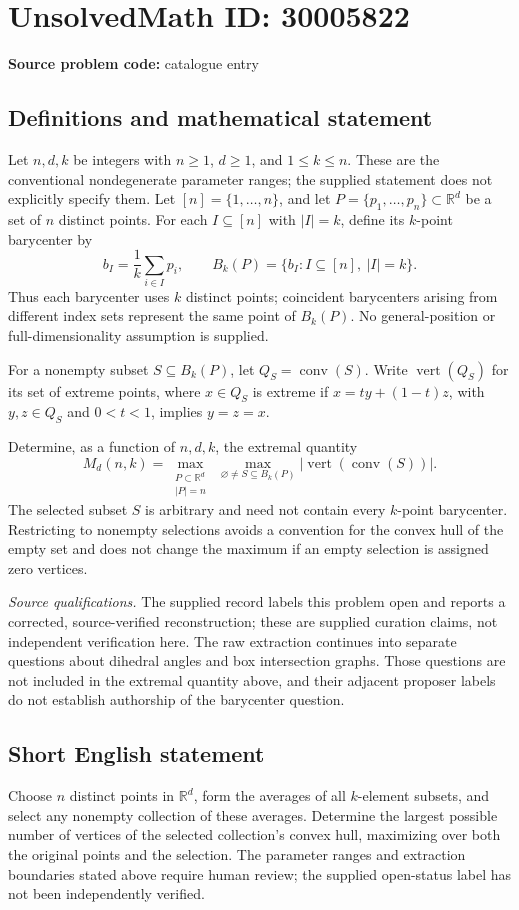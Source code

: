 \documentclass[11pt]{article}
\newcommand{\R}{\mathbb{R}}
\begin{document}
\section*{UnsolvedMath ID: 30005822}
\textbf{Source problem code:} catalogue entry
\subsection{Definitions and mathematical statement}
Let \(n,d,k\) be integers with \(n\geq 1\), \(d\geq 1\), and \(1\leq k\leq n\). These are the conventional nondegenerate parameter ranges; the supplied statement does not explicitly specify them. Let \([n]=\{1,\ldots,n\}\), and let \(P=\{p_1,\ldots,p_n\}\subset\R^d\) be a set of \(n\) distinct points. For each \(I\subseteq[n]\) with \(|I|=k\), define its \(k\)-point barycenter by
\[
 b_I=\frac{1}{k}\sum_{i\in I}p_i,
 \qquad
 B_k(P)=\{b_I:I\subseteq[n],\ |I|=k\}.
\]
Thus each barycenter uses \(k\) distinct points; coincident barycenters arising from different index sets represent the same point of \(B_k(P)\). No general-position or full-dimensionality assumption is supplied.

For a nonempty subset \(S\subseteq B_k(P)\), let \(Q_S=\operatorname{conv}(S)\). Write \(\operatorname{vert}(Q_S)\) for its set of extreme points, where \(x\in Q_S\) is extreme if \(x=ty+(1-t)z\), with \(y,z\in Q_S\) and \(0<t<1\), implies \(y=z=x\).

Determine, as a function of \(n,d,k\), the extremal quantity
\[
 M_d(n,k)=
 \max_{\substack{P\subset\R^d\\ |P|=n}}
 \ \max_{\varnothing\ne S\subseteq B_k(P)}
 \bigl|\operatorname{vert}(\operatorname{conv}(S))\bigr|.
\]
The selected subset \(S\) is arbitrary and need not contain every \(k\)-point barycenter. Restricting to nonempty selections avoids a convention for the convex hull of the empty set and does not change the maximum if an empty selection is assigned zero vertices.

\emph{Source qualifications.} The supplied record labels this problem open and reports a corrected, source-verified reconstruction; these are supplied curation claims, not independent verification here. The raw extraction continues into separate questions about dihedral angles and box intersection graphs. Those questions are not included in the extremal quantity above, and their adjacent proposer labels do not establish authorship of the barycenter question.
\subsection{Short English statement}
Choose \(n\) distinct points in \(\R^d\), form the averages of all \(k\)-element subsets, and select any nonempty collection of these averages. Determine the largest possible number of vertices of the selected collection's convex hull, maximizing over both the original points and the selection. The parameter ranges and extraction boundaries stated above require human review; the supplied open-status label has not been independently verified.
\end{document}
